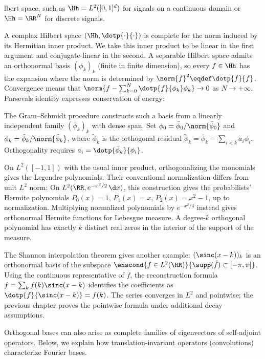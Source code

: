 lbert space, such as $\Hh=L^2([0,1]^d)$ for signals on a continuous domain or $\Hh=\RR^N$ for discrete signals.

A complex Hilbert space $(\Hh,\dotp{\cdot}{\cdot})$ is complete for the norm induced by its Hermitian inner product. We take this inner product to be linear in the first argument and conjugate-linear in the second. A separable Hilbert space admits an orthonormal basis $(\phi_k)_k$ (finite in finite dimension), so every $f\in\Hh$ has the expansion
where the norm is determined by $\norm{f}^2 \eqdef \dotp{f}{f}$. Convergence means that $\norm{ f - \sum_{k=0}^N \dotp{f}{\phi_k} \phi_k } \rightarrow 0$ as $N \rightarrow +\infty$. Parseval\textquotesingle s identity expresses conservation of energy:

The Gram--Schmidt procedure constructs such a basis from a linearly independent family $(\bar\phi_k)_k$ with dense span. Set $\phi_0=\bar\phi_0/\norm{\bar\phi_0}$ and $\phi_k=\tilde\phi_k/\norm{\tilde\phi_k}$, where $\tilde\phi_k$ is the orthogonal residual $\tilde\phi_k=\bar\phi_k - \sum_{i<k} a_i \phi_i$. Orthogonality requires $a_i = \dotp{\bar \phi_k}{\phi_i}$.

On $L^2([-1,1])$ with the usual inner product, orthogonalizing the monomials gives the Legendre polynomials. Their conventional normalization differs from unit $L^2$ norm:
On $L^2(\RR,e^{-x^2/2}\,\d x)$, this construction gives the probabilists' Hermite polynomials $P_0(x)=1$, $P_1(x)=x$, $P_2(x)=x^2-1$, up to normalization. Multiplying normalized polynomials by $e^{-x^2/4}$ instead gives orthonormal Hermite functions for Lebesgue measure. A degree-$k$ orthogonal polynomial has exactly $k$ distinct real zeros in the interior of the support of the measure.

The Shannon interpolation theorem gives another example: $( \sinc(x-k) )_k$ is an orthonormal basis of the subspace $\enscond{f\in L^2(\RR)}{\supp(\hat f) \subset [-\pi,\pi]}$. Using the continuous representative of $f$, the reconstruction formula $f=\sum_k f(k) \sinc(x-k)$ identifies the coefficients as $\dotp{f}{\sinc(x-k)} = f(k)$. The series converges in $L^2$ and pointwise; the previous chapter proves the pointwise formula under additional decay assumptions.


Orthogonal bases can also arise as complete families of eigenvectors of self-adjoint operators. Below, we explain how translation-invariant operators (convolutions) characterize Fourier bases.


